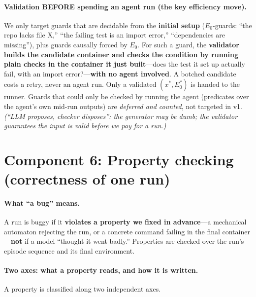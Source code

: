 \documentclass[11pt]{article}
\begin{document}
\paragraph{Validation BEFORE spending an agent run (the key efficiency move).}
We only target guards that are decidable from the \textbf{initial setup}
($E_0$-guards: ``the repo lacks file X,'' ``the failing test is an import
error,'' ``dependencies are missing''), plus guards causally forced by $E_0$.
For such a guard, the \textbf{validator builds the candidate container and checks
the condition by running plain checks in the container it just built}---does the
test it set up actually fail, with an import error?---\textbf{with no agent
involved}. A botched candidate costs a retry, never an agent run. Only a
validated $(x^*, E_0^*)$ is handed to the runner. Guards that could only be
checked by running the agent (predicates over the agent's own mid-run outputs)
are \emph{deferred and counted}, not targeted in v1. \emph{(``LLM proposes,
checker disposes'': the generator may be dumb; the validator guarantees the input
is valid before we pay for a run.)}

\section{Component 6: Property checking (correctness of one run)}
\label{sec:properties}

\paragraph{What ``a bug'' means.} A run is buggy if it \textbf{violates a
property we fixed in advance}---a mechanical automaton rejecting the run, or a
concrete command failing in the final container---\textbf{not} if a model
``thought it went badly.'' Properties are checked over the run's episode
sequence and its final environment.

\paragraph{Two axes: what a property reads, and how it is written.}
A property is classified along two independent axes.
\end{document}
